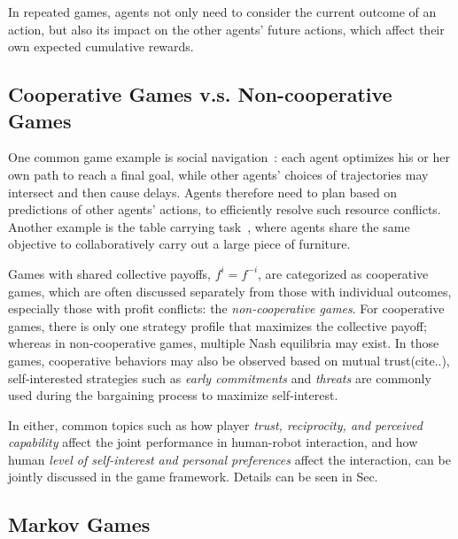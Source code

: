 \documentclass[letterpaper, 10 pt, conference]{ieeeconf}  %
\begin{document}
In repeated games, agents not only need to consider the current outcome of an 
action, but also its impact on the other agents' future actions, which affect 
their own expected cumulative rewards. 


\subsection{Cooperative Games v.s. Non-cooperative Games}
One common game example is social navigation~\cite{mavrogiannis2016decentralized}: each agent optimizes his or her own path to reach a final goal, while other agents' choices of trajectories may intersect and then cause delays. Agents therefore need to plan based on predictions of other agents' actions, to efficiently resolve such resource conflicts.  Another example is the table carrying task~\cite{nikolaidis2016formalizing}, where agents share the same objective to collaboratively carry out a large piece of furniture.

Games with shared collective payoffs, $f^i=f^{-i}$, are categorized as 
cooperative games, which are often discussed separately from those with 
individual outcomes, especially those with profit conflicts: the 
\textit{non-cooperative games}. For cooperative games, there is only one 
strategy profile that maximizes the collective payoff; whereas in 
non-cooperative games, multiple Nash equilibria may exist. In those games, 
cooperative behaviors may also be observed based on mutual trust(cite..), 
self-interested strategies such as \textit{early commitments} and \textit{threats} are commonly used during the 
bargaining process to maximize self-interest.

In either, common topics such as how player \textit{trust, reciprocity, and 
perceived capability} affect the joint performance in human-robot interaction, 
and how human \textit{level of self-interest and personal preferences} affect 
the interaction, can be jointly discussed in the game framework. Details can 
be seen in Sec.  

\subsection{Markov Games}
\end{document}
